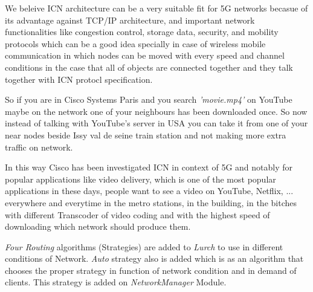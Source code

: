  We beleive ICN architecture can be a very suitable fit for 5G networks becasue of its advantage against TCP/IP architecture, and important network functionalities like congestion control, storage data, security, and mobility protocols which can be a good idea specially in case of wireless mobile communication in which nodes can be moved with every speed and channel conditions in the case that all of objects are connected together and they talk together with ICN protocl specification.

So if you are in Cisco Systems Paris and you search \textit{'movie.mp4'} on YouTube maybe on the network one of your neighbours has been downloaded once. So now instead of talking with YouTube's server in USA you can take it from one of your near nodes beside Issy val de seine train station and not making more extra traffic on network.


In this way Cisco has been investigated ICN in context of 5G and notably for popular applications like video delivery, which is one of the most popular applications in these days, people want to see a video on YouTube, Netflix, ... everywhere and everytime in the metro stations, in the building, in the bitches with different Transcoder of video coding and with the highest speed of downloading which network should produce them.

\textit{Four Routing} algorithms (Strategies) are added to \textit{Lurch} to use in different conditions of Network. \textit{Auto} strategy also is added which is as an algorithm that chooses the proper strategy in function of network condition and in demand of clients. This strategy is added on \textit{NetworkManager} Module.








